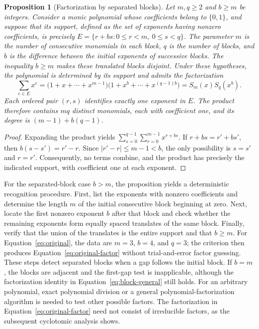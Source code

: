 \documentclass[11pt,a4paper]{article}
\numberwithin{equation}{section}
\theoremstyle{uprightpaper}
\newtheorem{proposition}{Proposition}[section]
\begin{document}
\begin{proposition}[Factorization by separated blocks]\label{prop:blockcriterion}
Let $m,q\geq2$ and $b\geq m$ be integers. Consider a monic polynomial
whose coefficients belong to $\{0,1\}$, and suppose that its support,
defined as the set of exponents having nonzero coefficients, is
precisely $E=\{r+bs:0\leq r<m,\ 0\leq s<q\}$. The parameter $m$
is the number of consecutive monomials in each block, $q$ is the number
of blocks, and $b$ is the difference between the initial exponents of
successive blocks. The inequality $b\geq m$ makes these translated
blocks disjoint. Under these hypotheses, the polynomial is determined
by its support and admits the factorization
\begin{equation}\label{eq:block-general}
 \sum_{e\in E}x^e
 =\bigl(1+x+\cdots+x^{m-1}\bigr)
  \bigl(1+x^b+\cdots+x^{(q-1)b}\bigr)
 = S_m(x)S_q(x^b).
\end{equation}
Each ordered pair $(r,s)$ identifies exactly one exponent in $E$.
The product therefore contains $mq$ distinct monomials, each with
coefficient one, and its degree is $(m-1)+b(q-1)$.
\end{proposition}
\begin{proof}
Expanding the product yields
$\sum_{s=0}^{q-1}\sum_{r=0}^{m-1}x^{r+bs}$.
If $r+bs=r'+bs'$, then $b(s-s')=r'-r$.
Since $|r'-r|\leq m-1<b$, the only possibility is
$s=s'$ and $r=r'$. Consequently, no terms combine, and
the product has precisely the indicated support, with
coefficient one at each exponent.
\end{proof}

For the separated-block case $b>m$, the proposition yields
a deterministic recognition procedure. First, list the exponents
with nonzero coefficients and determine the length $m$ of the
initial consecutive block beginning at zero. Next, locate the
first nonzero exponent $b$ after that block and check whether
the remaining exponents form equally spaced translates of the
same block. Finally, verify that the union of the translates is the
entire support and that $b\geq m$. For Equation~\eqref{eq:original},
the data are $m=3$, $b=4$, and $q=3$; the criterion then
produces Equation~\eqref{eq:original-factor} without trial-and-error
factor guessing. These steps detect separated blocks when a gap follows the
initial block. If $b=m$, the blocks are adjacent and the
first-gap test is inapplicable, although the factorization
identity in Equation~\eqref{eq:block-general} still holds. For an
arbitrary polynomial, exact polynomial division or a general
polynomial-factorization algorithm is needed to test other
possible factors. The factorization in
Equation~\eqref{eq:original-factor} need not consist of irreducible
factors, as the subsequent cyclotomic analysis shows.
\end{document}
